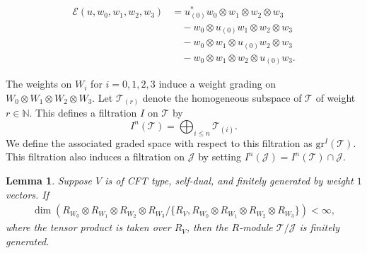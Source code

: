 \documentclass[9pt]{amsart}
\newtheorem{lemma}{Lemma}[section]
\newcommand{\T}{\mathcal{T}}
\newcommand{\J}{\mathcal{J}}
\begin{document}
{\begin{align*}
\mathcal{E}(u, w_0, w_1, w_2, w_3) &= u_{(0)}^{*} w_0 \otimes w_1 \otimes w_2 \otimes w_3 \\
&\quad - w_0 \otimes u_{(0)} w_1 \otimes w_2 \otimes w_3 \\
&\quad - w_0 \otimes w_1 \otimes u_{(0)} w_2 \otimes w_3 \\
&\quad - w_0 \otimes w_1 \otimes w_2 \otimes u_{(0)} w_3.
\end{align*}
}
  

The weights on $W_i$ for $i=0,1,2,3$ induce a weight grading on $W_0 \otimes W_1 \otimes W_2 \otimes W_3$. Let $\mathcal{T}_{(r)}$ denote the homogeneous subspace of $\mathcal{T}$ of weight $r \in \mathbb{N}$. This defines a filtration $I$ on $\mathcal{T}$ by
\[
I^n(\T) = \bigoplus_{i \leq n} \T_{(i)}.
\]
We define the associated graded space with respect to this filtration as $\mathrm{gr}^I(\T)$. This filtration also induces a filtration on $\J$ by setting $I^n(\J) = I^n(\T) \cap \J$.

\begin{lemma}\label{quasilissecondition}
Suppose $V$ is of CFT type, self-dual, and finitely generated by weight $1$ vectors. If
\begin{align}\label{newfinitenss}
\dim \left( R_{W_0} \otimes R_{W_1} \otimes R_{W_2} \otimes R_{W_3} \big/ \{ R_V, R_{W_0} \otimes R_{W_1} \otimes R_{W_2} \otimes R_{W_3} \} \right) < \infty,
\end{align}
where the tensor product is taken over $R_V$, then the $R$-module $\T/\J$ is finitely generated.
\end{lemma}
\end{document}
